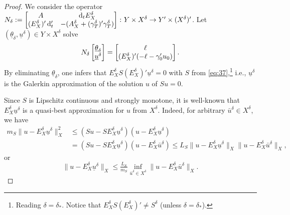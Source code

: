 \documentclass{amsart}
\numberwithin{equation}{section}
\newcommand{\NN}{N}
\newcommand{\1}{\mathbb 1}
\newcommand*\diff{\mathop{}\!\mathrm{d}}
\newcommand{\be}{\begin{equation}}
\newcommand{\ee}{\end{equation}}
\begin{document}
\begin{proof} We consider the operator $\NN_\delta := \left[\begin{array}{@{}cc@{}} A & \diff_t E_X^\delta\\ (E_X^\delta)' \diff_t'& -(A_X^\delta+(\gamma^\delta_T)' \gamma^\delta_T)\end{array}\right]\colon Y \times X^\delta \rightarrow Y' \times (X^\delta)'$. 
Let $(\underline{\theta}_\delta,\underline{u}^\delta) \in Y \times X^\delta$ solve
\be \label{eq:38}
\NN_\delta \left[\begin{array}{@{}c@{}} \underline{\theta}_\delta \\ \underline{u}^\delta \end{array}\right]=\left[\begin{array}{@{}c@{}} \ell \\  (E^\delta_X)' (-\ell-\gamma_0' u_0) \end{array}\right].
\ee
By eliminating $\underline{\theta}_\delta$, one infers that $E_X^\delta S (E_X^\delta)' \underline{u}^\delta=0$ with $S$ from \eqref{eq:37},\footnote{Reading $\delta=\delta_*$. Notice that $E_X^\delta S (E_X^\delta)' \neq S^\delta$ (unless $\delta=\delta_*$).} i.e., $\underline{u}^\delta$ is the Galerkin approximation of the solution $u$ of $Su=0$.

Since $S$ is Lipschitz continuous and strongly monotone, it is well-known  that $E_X^\delta \underline{u}^\delta$ is a quasi-best approximation for $u$ from $X^\delta$. Indeed, for arbitrary $\bar{u}^\delta \in X^\delta$, we have
\begin{align*}
 m_S \|u-E_X^\delta \underline{u}^\delta\|_X^2& \leq (S u-S E_X^\delta \underline{u}^\delta)(u-E_X^\delta \underline{u}^\delta)\\
& =(S u-S E_X^\delta \underline{u}^\delta)(u-E_X^\delta \bar{u}^\delta)
\leq L_S \|u-E_X^\delta \underline{u}^\delta\|_X\|u-E_X^\delta \bar{u}^\delta\|_X,
\end{align*}
or
\be \label{eq:16}
\|u-E_X^\delta \underline{u}^\delta\|_X \leq \tfrac{L_S}{m_S}\inf_{\bar{u}^\delta \in X^\delta}\|u-E_X^\delta \bar{u}^\delta\|_X.
\ee


\end{proof}
\end{document}
